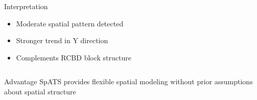 \begin{frame}
\begin{columns}[T]
\begin{column}{0.5\textwidth}
            \begin{block}{Interpretation}
                \begin{itemize}
                    \item Moderate spatial pattern detected
                    \item Stronger trend in Y direction
                    \item Complements RCBD block structure
                \end{itemize}
            \end{block}
        \end{column}
    \end{columns}
    
    \vspace{1em}
    
    \begin{exampleblock}{Advantage}
        SpATS provides flexible spatial modeling without prior assumptions about spatial structure
    \end{exampleblock}
\end{frame}

